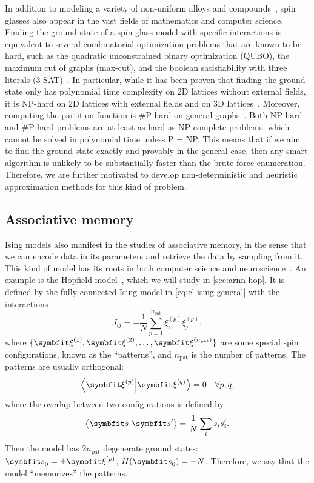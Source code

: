 In addition to modeling a variety of non-uniform alloys and compounds~\cite{mydosh2015spin}, spin glasses also appear in the vast fields of mathematics and computer science. Finding the ground state of a spin glass model with specific interactions is equivalent to several combinatorial optimization problems that are known to be hard, such as the quadratic unconstrained binary optimization (QUBO), the maximum cut of graphs (max-cut), and the boolean satisfiability with three literals (3-SAT)~\cite{karp1972reducibility}. In particular, while it has been proven that finding the ground state only has polynomial time complexity on 2D lattices without external fields, it is NP-hard on 2D lattices with external fields and on 3D lattices~\cite{barahona1982computational}. Moreover, computing the partition function is \#P-hard on general graphs~\cite{galanis2016inapproximability, fefferman2017exact, peters2020location}. Both NP-hard and \#P-hard problems are at least as hard as NP-complete problems, which cannot be solved in polynomial time unless P = NP. This means that if we aim to find the ground state exactly and provably in the general case, then any smart algorithm is unlikely to be substantially faster than the brute-force enumeration. Therefore, we are further motivated to develop non-deterministic and heuristic approximation methods for this kind of problem.

\subsection{Associative memory}
\label{sec:hopfield}

Ising models also manifest in the studies of associative memory, in the sense that we can encode data in its parameters and retrieve the data by sampling from it. This kind of model has its roots in both computer science and neuroscience~\cite{carpenter1989neural}. An example is the Hopfield model~\cite{hopfield1982neural, amit1985spin}, which we will study in \cref{sec:arnn-hop}. It is defined by the fully connected Ising model in \cref{eq:cl-ising-general} with the interactions
\begin{equation}
J_{i j} = -\frac{1}{N} \sum_{p = 1}^{n_\text{pat}} \xi^{(p)}_i \xi^{(p)}_j,
\label{eq:hopfield}
\end{equation}
where $\{\vxi^{(1)}, \vxi^{(2)}, \ldots, \vxi^{(n_\text{pat})}\}$ are some special spin configurations, known as the ``patterns'', and $n_\text{pat}$ is the number of patterns. The patterns are usually orthogonal:
\begin{equation}
\ip{\vxi^{(p)}}{\vxi^{(q)}} = 0 \quad \forall p, q,
\label{eq:cl-ortho}
\end{equation}
where the overlap between two configurations is defined by
\begin{equation}
\ip{\vs}{\vs'} = \frac{1}{N} \sum_i s_i s'_i.
\label{eq:cl-overlap}
\end{equation}
Then the model has $2 n_\text{pat}$ degenerate ground states: $\vs_0 = \pm \vxi^{(p)}$, $H(\vs_0) = -N$. Therefore, we say that the model ``memorizes'' the patterns.

